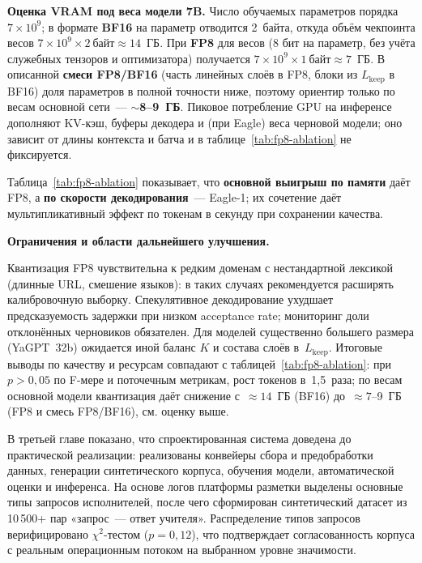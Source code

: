 \documentclass[times]{itmo-student-thesis}
\begin{document}
\textbf{Оценка VRAM под веса модели 7B.} Число обучаемых параметров
порядка $7\times 10^9$; в формате \textbf{BF16} на параметр отводится
2~байта, откуда объём чекпоинта весов
$7\times 10^9\times 2~\text{байт}\approx 14$~ГБ.
При \textbf{FP8} для весов (8 бит на параметр, без учёта служебных
тензоров и оптимизатора) получается
$7\times 10^9\times 1~\text{байт}\approx 7$~ГБ.
В описанной \textbf{смеси FP8/BF16} (часть линейных слоёв в FP8,
блоки из $L_{\mathrm{keep}}$ в BF16) доля параметров в полной точности
ниже, поэтому ориентир только по весам основной сети~---
\textbf{$\sim$8--9~ГБ}. Пиковое потребление GPU на инференсе дополняют
KV-кэш, буферы декодера и (при Eagle) веса черновой модели; оно
зависит от длины контекста и батча и в таблице~\ref{tab:fp8-ablation}
не фиксируется.

Таблица~\ref{tab:fp8-ablation} показывает, что \textbf{основной выигрыш
по памяти} даёт FP8, а \textbf{по скорости декодирования}~--- Eagle-1;
их сочетение даёт мультипликативный эффект по токенам в секунду при
сохранении качества.

\medskip\noindent\textbf{Ограничения и области дальнейшего улучшения.}\par
Квантизация FP8 чувствительна к редким доменам с нестандартной лексикой
(длинные URL, смешение языков): в таких случаях рекомендуется расширять
калибровочную выборку. Спекулятивное декодирование ухудшает предсказуемость
задержки при низком acceptance rate; мониторинг доли отклонённых
черновиков обязателен. Для моделей существенно большего размера
(YaGPT~32b) ожидается иной баланс $K$ и состава слоёв в~$L_{\mathrm{keep}}$.
Итоговые выводы по качеству и ресурсам совпадают с
таблицей~\ref{tab:fp8-ablation}: при
$p>0{,}05$ по F-мере и поточечным метрикам, рост токенов в~1{,}5~раза; по весам
основной модели квантизация даёт снижение с~$\approx 14$~ГБ (BF16)
до~$\approx 7$--9~ГБ (FP8 и смесь FP8/BF16), см. оценку выше.

\chapterconclusion

В третьей главе показано, что спроектированная система доведена до
практической реализации: реализованы конвейеры сбора и предобработки данных,
генерации синтетического корпуса, обучения модели, автоматической оценки
и инференса. На основе логов платформы разметки выделены основные типы
запросов исполнителей, после чего сформирован синтетический датасет из
10\,500+ пар «запрос~--- ответ учителя». Распределение типов запросов
верифицировано $\chi^2$-тестом ($p = 0{,}12$), что подтверждает согласованность
корпуса с реальным операционным потоком на выбранном уровне значимости.
\end{document}

